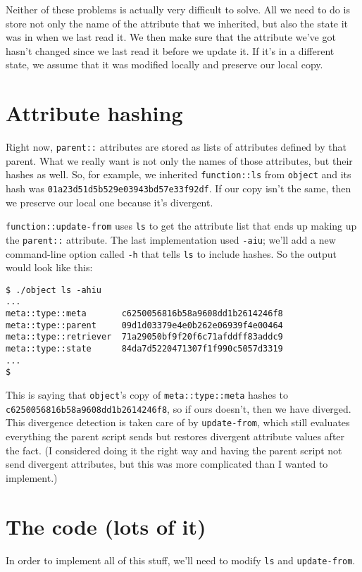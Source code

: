 \documentclass{report}
\begin{document}
  Neither of these problems is actually very difficult to solve. All we need to do is store not only the name of the attribute that we inherited, but also the state it was in when we last read
  it. We then make sure that the attribute we've got hasn't changed since we last read it before we update it. If it's in a different state, we assume that it was modified locally and preserve
  our local copy.

\section{Attribute hashing}
    Right now, {\tt parent::} attributes are stored as lists of attributes defined by that parent. What we really want is not only the names of those attributes, but their hashes as well. So,
    for example, we inherited {\tt function::ls} from {\tt object} and its hash was {\tt 01a23d51d5b529e03943bd57e33f92df}. If our copy isn't the same, then we preserve our local one because
    it's divergent.

    {\tt function::update-from} uses {\tt ls} to get the attribute list that ends up making up the {\tt parent::} attribute. The last implementation used {\tt -aiu}; we'll add a new
    command-line option called {\tt -h} that tells {\tt ls} to include hashes. So the output would look like this:

\begin{verbatim}
$ ./object ls -ahiu
...
meta::type::meta       c6250056816b58a9608dd1b2614246f8
meta::type::parent     09d1d03379e4e0b262e06939f4e00464
meta::type::retriever  71a29050bf9f20f6c71afddff83addc9
meta::type::state      84da7d5220471307f1f990c5057d3319
...
$
\end{verbatim}

    This is saying that {\tt object}'s copy of {\tt meta::type::meta} hashes to {\tt c6250056816b58a9608dd1b2614246f8}, so if ours doesn't, then we have diverged. This divergence detection is
    taken care of by {\tt update-from}, which still evaluates everything the parent script sends but restores divergent attribute values after the fact. (I considered doing it the right way
    and having the parent script not send divergent attributes, but this was more complicated than I wanted to implement.)

\section{The code (lots of it)}
    In order to implement all of this stuff, we'll need to modify {\tt ls} and {\tt update-from}.
\end{document}
